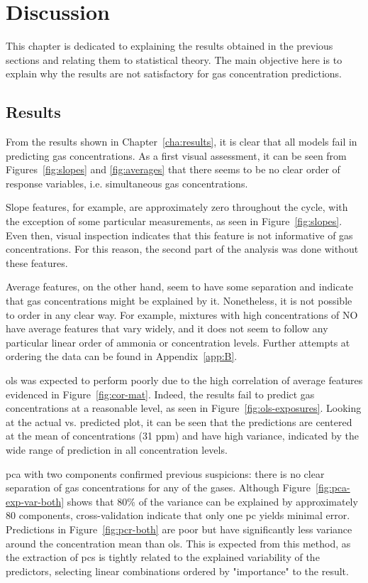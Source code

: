 \chapter{Discussion}
\label{cha:discussion}

This chapter is dedicated to explaining the results obtained in the previous sections and relating them to statistical theory. The main objective here is to explain why the results are not satisfactory for gas concentration predictions.

\section{Results}
\label{sec:discussion-results}

From the results shown in Chapter~\ref{cha:results}, it is clear that all models fail in predicting gas concentrations. As a first visual assessment, it can be seen from Figures~\ref{fig:slopes} and \ref{fig:averages} that there seems to be no clear order of response variables, i.e. simultaneous gas concentrations.

 Slope features, for example, are approximately zero throughout the cycle, with the exception of some particular measurements, as seen in Figure~\ref{fig:slopes}. Even then, visual inspection indicates that this feature is not informative of gas concentrations. For this reason, the second part of the analysis was done without these features.
 
 Average features, on the other hand, seem to have some separation and indicate that gas concentrations might be explained by it. Nonetheless, it is not possible to order in any clear way. For example, mixtures with high concentrations of NO have average features that vary widely, and it does not seem to follow any particular linear order of ammonia or \nox concentration levels. Further attempts at ordering the data can be found in Appendix~\ref{app:B}. 
 
\acrlong{ols} was expected to perform poorly due to the high correlation of average features evidenced in Figure~\ref{fig:cor-mat}. Indeed, the results fail to predict gas concentrations at a reasonable level, as seen in Figure~\ref{fig:ols-exposures}. Looking at the actual vs. predicted plot, it can be seen that the predictions are centered at the mean of concentrations (31 ppm) and have high variance, indicated by the wide range of prediction in all concentration levels.

\acrshort{pca} with two components confirmed previous suspicions: there is no clear separation of gas concentrations for any of the gases. Although Figure~\ref{fig:pca-exp-var-both} shows that 80\% of the variance can be explained by approximately 80 components, cross-validation indicate that only one \acrshort{pc} yields minimal error. Predictions in Figure~\ref{fig:pcr-both} are poor but have significantly less variance around the concentration mean than \acrshort{ols}. This is expected from this method, as the extraction of \acrshort{pc}s is tightly related to the explained variability of the predictors, selecting linear combinations ordered by "importance" to the result.

